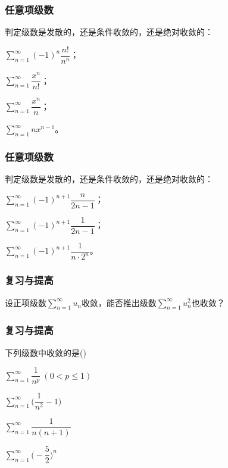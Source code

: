 \documentclass[14pt,notheorems,leqno,xcolor={rgb}]{beamer} %
\begin{document}
\begin{frame}
\frametitle{任意项级数}
\begin{example}
判定级数是发散的，还是条件收敛的，还是绝对收敛的：
\begin{multicols}{2}
\begin{enumlite}[<+->]
  \item $\sum\limits_{n=1}^{\infty}(-1)^n\dfrac{n!}{n^n}$；
  \item $\sum\limits_{n=1}^{\infty}\dfrac{x^n}{n!}$；
  \item $\sum\limits_{n=1}^{\infty}\dfrac{x^n}{n}$；
  \item $\sum\limits_{n=1}^{\infty}nx^{n-1}$。
\end{enumlite}
\end{multicols}
\end{example}
\end{frame}

\begin{frame}
\frametitle{任意项级数}
\begin{exercise}
判定级数是发散的，还是条件收敛的，还是绝对收敛的：
\begin{enumlite}[<+->]
  \item $\sum\limits_{n=1}^{\infty}(-1)^{n+1}\dfrac{n}{2n-1}$；
  \item $\sum\limits_{n=1}^{\infty}(-1)^{n+1}\dfrac{1}{2n-1}$；
  \item $\sum\limits_{n=1}^{\infty}(-1)^{n+1}\dfrac{1}{n\cdot2^n}$。
\end{enumlite}
\end{exercise}
\end{frame}


\begin{frame}
\frametitle{复习与提高}
\begin{puzzle}
设正项级数$\sum\limits_{n=1}^{\infty}u_n$收敛，能否推出级数$\sum\limits_{n=1}^{\infty}u_n^2$也收敛？
\end{puzzle}
\end{frame}

\begin{frame}
\frametitle{复习与提高}
\begin{choice}
下列级数中收敛的是\dotfill()
\begin{choicehalf}
  \item $\sum\limits_{n=1}^{\infty}\dfrac{1}{n^p}\ (0<p\le1)$  ~
  \item $\sum\limits_{n=1}^{\infty}\bigg(\dfrac{1}{n^2}-1\bigg)$ ~
  \item $\sum\limits_{n=1}^{\infty}\dfrac{1}{n(n+1)}$ ~
  \item $\sum\limits_{n=1}^{\infty}\bigg(\!-\dfrac{5}{2}\bigg)^n$ ~
\end{choicehalf}
\end{choice}
\end{frame}
\end{document}
